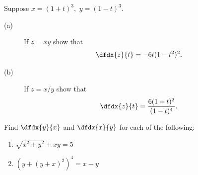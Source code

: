\begin{ProblemSection}
    \begin{embeddedproblem}{}
      Suppose $x=(1+t)^3,$ $y=(1-t)^3.$
      \begin{description}
      \item[(a)] If $z=xy$ show that
        \[
          \dfdx{z}{t} = -6t(1-t^2)^2.
        \]
      \item[(b)] If $z=x/y$ show that
        \[
          \dfdx{z}{t} = \frac{6(1+t)^2}{(1-t)^4}.
        \]
      \end{description}
    \end{embeddedproblem}

    \begin{embeddedproblem}{}
       Find $\dfdx{y}{x}$  and $\dfdx{x}{y}$  for each of the
       following:
       \begin{enumerate}[label={\bf{}(\alph*)}]{}
       \item $\sqrt{x^2+y^2}+xy=5$
       \item $
         \left(
           y+(y+x)^2
         \right)^4=x-y$
       \end{enumerate}
     \end{embeddedproblem}


\end{ProblemSection}
